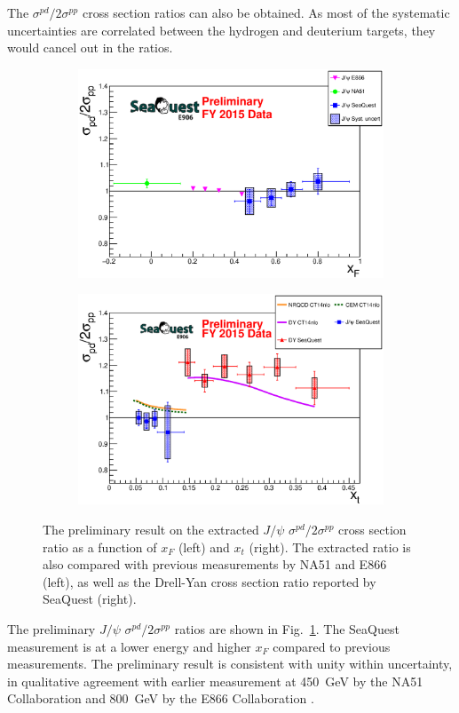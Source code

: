 \documentclass[10pt, a4paper,final]{article}
\begin{document}
The $\sigma^{pd}/2\sigma^{pp}$ cross section ratios can also be obtained. As most of the
systematic uncertainties are correlated between the hydrogen and deuterium targets,
they would cancel out in the ratios.
\begin{figure}[htbp!]
	\centering
	\begin{subfigure}{0.45\linewidth}
		\includegraphics[width=0.9\linewidth]{jPsi_all_noTheory_v2}
	\end{subfigure}
	\begin{subfigure}{0.45\linewidth}
		\includegraphics[width=0.9\linewidth]{jPsi_csr_x2_nature_NRQCD_CEM}
	\end{subfigure}
	\caption{The preliminary result on the extracted $J/\psi$ $\sigma^{pd}/2\sigma^{pp}$
		cross section ratio as a function of $x_F$ (left) and $x_t$ (right).
		The extracted ratio is also compared with previous measurements by NA51
		and E866 (left), as well as the Drell-Yan cross section ratio reported
		by SeaQuest\cite{dove2021} (right).}
	\label{fig:csr}
\end{figure}
The preliminary $J/\psi$ $\sigma^{pd}/2\sigma^{pp}$ ratios are shown in
Fig.~\ref{fig:csr}. The SeaQuest measurement is at a lower energy and higher $x_F$
compared to previous measurements. The preliminary result is consistent with unity
within uncertainty, in qualitative agreement with earlier measurement at \SI{450}{\GeV}
by the NA51 Collaboration \cite{abreu1998} and \SI{800}{\GeV} by the E866 Collaboration
\cite{peng2003}.
\end{document}
